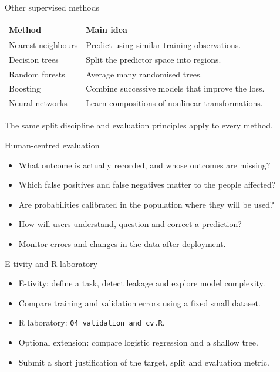 \begin{frame}{Other supervised methods}
\begin{center}\begin{tabular}{lp{}}\toprule
Method & Main idea\\\midrule Nearest neighbours & Predict using similar training observations.\\ Decision trees & Split the predictor space into regions.\\ Random forests & Average many randomised trees.\\ Boosting & Combine successive models that improve the loss.\\ Neural networks & Learn compositions of nonlinear transformations.\\
\bottomrule\end{tabular}\end{center}The same split discipline and evaluation principles apply to every method.
\end{frame}

\begin{frame}{Human-centred evaluation}
\begin{itemize}
\item What outcome is actually recorded, and whose outcomes are missing?
\item Which false positives and false negatives matter to the people affected?
\item Are probabilities calibrated in the population where they will be used?
\item How will users understand, question and correct a prediction?
\item Monitor errors and changes in the data after deployment.
\end{itemize}
\end{frame}

\begin{frame}{E-tivity and R laboratory}
\begin{itemize}
\item E-tivity: define a task, detect leakage and explore model complexity.
\item Compare training and validation errors using a fixed small dataset.
\item R laboratory: \texttt{04\_validation\_and\_cv.R}.
\item Optional extension: compare logistic regression and a shallow tree.
\item Submit a short justification of the target, split and evaluation metric.
\end{itemize}
\end{frame}

